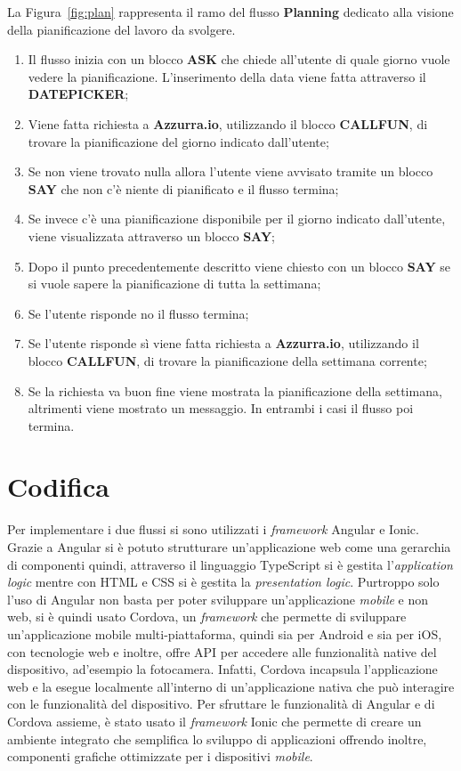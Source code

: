 La Figura~\ref{fig:plan} rappresenta il ramo del flusso \textbf{Planning} dedicato alla visione della pianificazione del lavoro da svolgere.
\begin{enumerate}
	\item Il flusso inizia con un blocco \textbf{ASK} che chiede all'utente di quale giorno vuole vedere la pianificazione. L'inserimento della data viene fatta attraverso il \textbf{DATEPICKER};
	\item Viene fatta richiesta a \textbf{Azzurra.io}, utilizzando il blocco \textbf{CALLFUN}, di trovare la pianificazione del giorno indicato dall'utente;
	\item Se non viene trovato nulla allora l'utente viene avvisato tramite un blocco \textbf{SAY} che non c'è niente di pianificato e il flusso termina;
	\item Se invece c'è una pianificazione disponibile per il giorno indicato dall'utente, viene visualizzata attraverso un blocco \textbf{SAY};
	\item Dopo il punto precedentemente descritto viene chiesto con un blocco \textbf{SAY} se si vuole sapere la pianificazione di tutta la settimana;
	\item Se l'utente risponde no il flusso termina;
	\item Se l'utente risponde sì viene fatta richiesta a \textbf{Azzurra.io}, utilizzando il blocco \textbf{CALLFUN}, di trovare la pianificazione della settimana corrente;
	\item Se la richiesta va buon fine viene mostrata la pianificazione della settimana, altrimenti viene mostrato un messaggio. In entrambi i casi il flusso poi termina.
\end{enumerate}

\section{Codifica}
Per implementare i due flussi si sono utilizzati i \emph{framework} Angular e Ionic. Grazie a Angular si è potuto strutturare un’applicazione web come una gerarchia di componenti quindi, attraverso il linguaggio TypeScript si è gestita l'\emph{application logic} mentre con HTML e CSS si è gestita la \emph{presentation logic}. Purtroppo solo l'uso di Angular non basta per poter sviluppare un'applicazione \emph{mobile} e non web, si è quindi usato Cordova, un \emph{framework} che permette di sviluppare un'applicazione mobile multi-piattaforma, quindi sia per Android e sia per iOS, con tecnologie web e inoltre, offre API per accedere alle funzionalità native del dispositivo, ad'esempio la fotocamera. Infatti, Cordova incapsula l'applicazione web e la esegue localmente all’interno di un’applicazione nativa che può interagire con le funzionalità del dispositivo. Per sfruttare le funzionalità di Angular e di Cordova assieme, è stato usato il \emph{framework} Ionic che permette di creare un ambiente integrato che semplifica lo sviluppo di applicazioni offrendo inoltre, componenti grafiche ottimizzate per i dispositivi \emph{mobile}.\\


